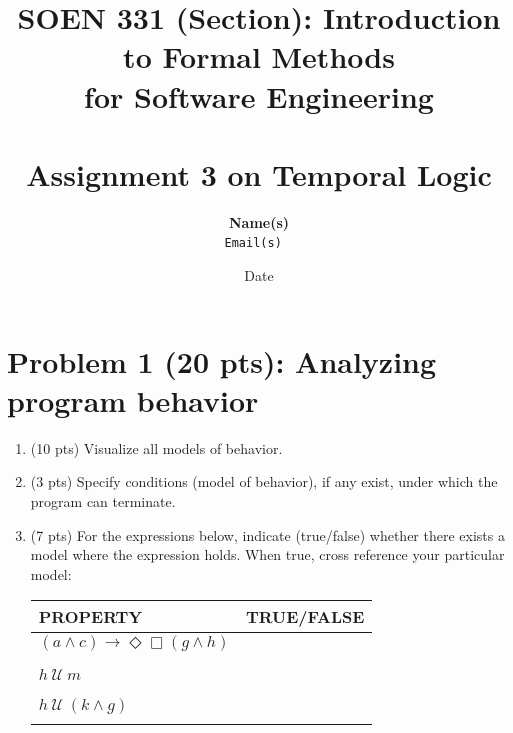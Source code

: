\documentclass[12pt]{article}
\title{SOEN 331 (Section): Introduction to Formal Methods\\for Software Engineering\\
\ \\
Assignment 3 on Temporal Logic}
\author{\textbf{Name(s)}\\
		\texttt{Email(s)}
\ \\}
\date{Date}
\begin{document}
\maketitle

\newpage

\section*{Problem 1 (20 pts):  Analyzing program behavior}

\begin{enumerate}

\item (10 pts) Visualize all models of behavior.

%

\item (3 pts) Specify conditions (model of behavior), if any exist, under which the program can terminate.

\item (7 pts) For the expressions below, indicate (true/false) whether there exists a 
model where the expression holds. When true, cross reference your particular model:

\begin{table}
\centering
\begin{tabular}{|l|l|}
\hline
\textbf{PROPERTY}							& \textbf{TRUE/FALSE}\\
\hline

$(a \wedge c) \rightarrow \Diamond \Box (g \wedge h)$	 &\\

&\\

\hline

&\\
		
$h ~\mathcal{U}~ m$									 &\\

&\\

\hline

&\\
		
$h ~\mathcal{U}~ (k \wedge g)$						 &\\

&\\

\hline


\end{tabular}
\end{table}
\end{enumerate}
\end{document}
